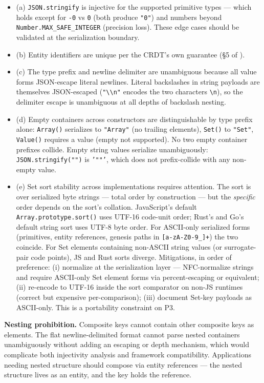 \begin{itemize}
    \item (a) \texttt{JSON.stringify} is injective for the supported primitive types --- which holds except for \texttt{-0} vs \texttt{0} (both produce \texttt{"0"}) and numbers beyond \texttt{Number.MAX\_SAFE\_INTEGER} (precision loss). These edge cases should be validated at the serialization boundary.
    \item (b) Entity identifiers are unique per the CRDT's own guarantee (\S 5 of \cite{plexus:arch}).
    \item (c) The type prefix and newline delimiter are unambiguous because all value forms JSON-escape literal newlines. Literal backslashes in string payloads are themselves JSON-escaped (\texttt{"\textbackslash\textbackslash n"} encodes the two characters \texttt{\textbackslash n}), so the delimiter escape is unambiguous at all depths of backslash nesting.
    \item (d) Empty containers across constructors are distinguishable by type prefix alone: \texttt{Array()} serializes to \texttt{"Array"} (no trailing elements), \texttt{Set()} to \texttt{"Set"}, \texttt{Value()} requires a value (empty not supported). No two empty container prefixes collide. Empty string values serialize unambiguously: \texttt{JSON.stringify("")} is \texttt{'""'}, which does not prefix-collide with any non-empty value.
    \item (e) Set sort stability across implementations requires attention. The sort is over serialized byte strings --- total order by construction --- but the \emph{specific} order depends on the sort's collation. JavaScript's default \texttt{Array.prototype.sort()} uses UTF-16 code-unit order; Rust's and Go's default string sort uses UTF-8 byte order. For ASCII-only serialized forms (primitives, entity references, genesis paths in \texttt{[a-zA-Z0-9\_]+}) the two coincide. For Set elements containing non-ASCII string values (or surrogate-pair code points), JS and Rust sorts diverge. Mitigations, in order of preference: (i) normalize at the serialization layer --- NFC-normalize strings and require ASCII-only Set element forms via percent-escaping or equivalent; (ii) re-encode to UTF-16 inside the sort comparator on non-JS runtimes (correct but expensive per-comparison); (iii) document Set-key payloads as ASCII-only. This is a portability constraint on P3.
\end{itemize}

\textbf{Nesting prohibition.} Composite keys cannot contain other composite keys as elements. The flat newline-delimited format cannot parse nested containers unambiguously without adding an escaping or depth mechanism, which would complicate both injectivity analysis and framework compatibility. Applications needing nested structure should compose via entity references --- the nested structure lives as an entity, and the key holds the reference.

